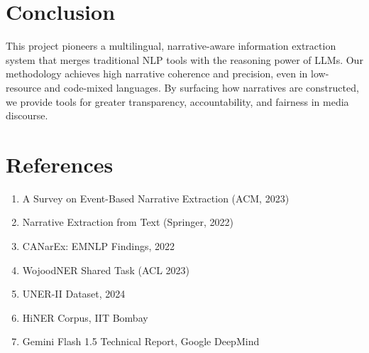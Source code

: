 \documentclass[12pt]{article}
\begin{document}
\section{Conclusion}

This project pioneers a multilingual, narrative-aware information extraction system that merges traditional NLP tools with the reasoning power of LLMs. Our methodology achieves high narrative coherence and precision, even in low-resource and code-mixed languages. By surfacing how narratives are constructed, we provide tools for greater transparency, accountability, and fairness in media discourse.

\section*{References}
\begin{enumerate}
    \item A Survey on Event-Based Narrative Extraction (ACM, 2023)
    \item Narrative Extraction from Text (Springer, 2022)
    \item CANarEx: EMNLP Findings, 2022
    \item WojoodNER Shared Task (ACL 2023)
    \item UNER-II Dataset, 2024
    \item HiNER Corpus, IIT Bombay
    \item Gemini Flash 1.5 Technical Report, Google DeepMind
\end{enumerate}
\end{document}
